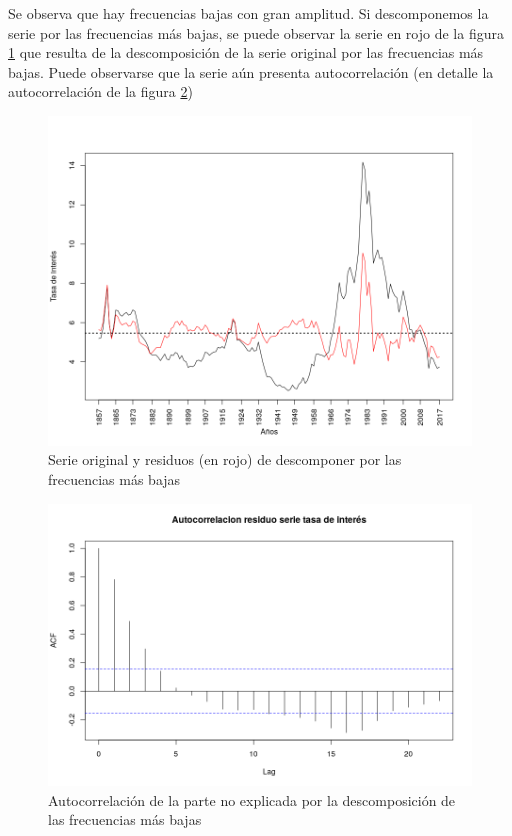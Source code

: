 \documentclass[a4paper]{article}
\begin{document}
Se observa que hay frecuencias bajas con gran amplitud. Si descomponemos la serie por las frecuencias más bajas, se puede observar la serie en rojo de la figura \ref{fig:ir_orig_resid} que resulta de la descomposición de la serie original por las frecuencias más bajas. Puede observarse que la serie aún presenta autocorrelación (en detalle la autocorrelación de la figura \ref{fig:ir_resid_acf})

\begin{figure}[H]
	\centering
	\includegraphics[width=0.8\linewidth]{ir_orig_resid.png}
	\caption{Serie original y residuos (en rojo) de descomponer por las frecuencias más bajas} 	
	\label{fig:ir_orig_resid}
\end{figure}

\begin{figure}[H]
	\centering
	\includegraphics[width=0.8\linewidth]{ir_resid_acf.png}
	\caption{Autocorrelación de la parte no explicada por la descomposición de las frecuencias más bajas} 	
	\label{fig:ir_resid_acf}
\end{figure}
\end{document}
